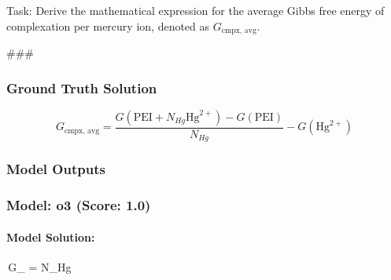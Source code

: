 \documentclass[10pt]{article}
\begin{document}
Task:
Derive the mathematical expression for the average Gibbs free energy of complexation per mercury ion, denoted as $G_{\text{cmpx, avg}}$.

###

\subsubsection*{Ground Truth Solution}
\[ \boxed{G_{\text{cmpx, avg}} = \frac{G(\text{PEI} + N_{Hg}\text{Hg}^{2+}) - G(\text{PEI})}{N_{Hg}} - G(\text{Hg}^{2+})} \]

\subsubsection*{Model Outputs}
\subsubsection*{Model: o3 (Score: 1.0)}
\paragraph*{Model Solution:}
\,G_{}
       = 
              {N_{Hg}}\,
\end{document}
